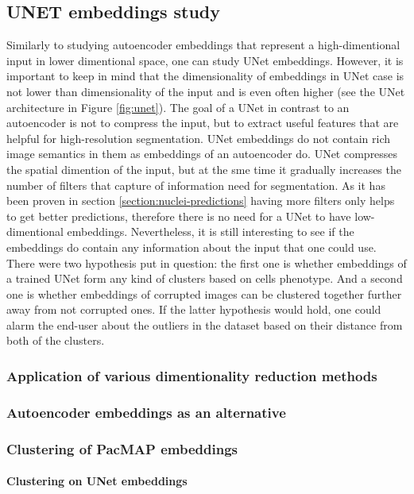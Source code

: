 \subsection{UNET embeddings study}
    Similarly to studying autoencoder embeddings that represent a high-dimentional input in lower dimentional space, one can study UNet embeddings. However, it is important to keep in mind that the dimensionality of embeddings in UNet case is not lower than dimensionality of the input and is even often higher (see the UNet architecture in Figure \ref{fig:unet}). The goal of a UNet in contrast to an autoencoder is not to compress the input, but to extract useful features that are helpful for high-resolution segmentation. UNet embeddings do not contain rich image semantics in them as embeddings of an autoencoder do. UNet compresses the spatial dimention of the input, but at the sme time it gradually increases the number of filters that capture of information need for segmentation. As it has been proven in section \ref{section:nuclei-predictions} having more filters only helps to get better predictions, therefore there is no need for a UNet to have low-dimentional embeddings. Nevertheless, it is still interesting to see if the embeddings do contain any information about the input that one could use. There were two hypothesis put in question: the first one is whether embeddings of a trained UNet form any kind of clusters based on cells phenotype. And a second one is whether embeddings of corrupted images can be clustered together further away from not corrupted ones. If the latter hypothesis would hold, one could alarm the end-user about the outliers in the dataset based on their distance from both of the clusters. 
    \subsubsection{Application of various dimentionality reduction methods}
        
    \subsubsection{Autoencoder embeddings as an alternative}
        
    \subsubsection{Clustering of PacMAP embeddings}
        \paragraph{Clustering on UNet embeddings}
        \label{section:clustering-on-unet-embeddings}
        